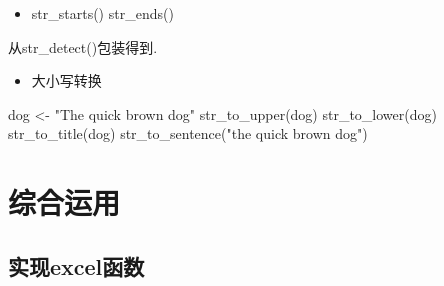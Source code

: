 \documentclass[
]{book}
\newenvironment{Shaded}{\begin{snugshade}}{\end{snugshade}}
\newcommand{\FunctionTok}[1]{\textcolor[rgb]{0.00,0.00,0.00}{#1}}
\newcommand{\NormalTok}[1]{#1}
\newcommand{\OtherTok}[1]{\textcolor[rgb]{0.56,0.35,0.01}{#1}}
\newcommand{\StringTok}[1]{\textcolor[rgb]{0.31,0.60,0.02}{#1}}
\providecommand{\tightlist}{%
  \setlength{\itemsep}{0pt}\setlength{\parskip}{0pt}}
\begin{document}
\begin{itemize}
\tightlist
\item
  str\_starts() str\_ends()
\end{itemize}

从str\_detect()包装得到.

\begin{Shaded}
\end{Shaded}

\begin{itemize}
\tightlist
\item
  大小写转换
\end{itemize}

\begin{Shaded}
\begin{Highlighting}[]
\NormalTok{dog }\OtherTok{\textless{}{-}} \StringTok{"The quick brown dog"}
\FunctionTok{str\_to\_upper}\NormalTok{(dog)}
\FunctionTok{str\_to\_lower}\NormalTok{(dog)}
\FunctionTok{str\_to\_title}\NormalTok{(dog)}
\FunctionTok{str\_to\_sentence}\NormalTok{(}\StringTok{"the quick brown dog"}\NormalTok{)}
\end{Highlighting}
\end{Shaded}

\hypertarget{ux7efcux5408ux8fd0ux7528}{%
\section{综合运用}\label{ux7efcux5408ux8fd0ux7528}}

\hypertarget{ux5b9eux73b0excelux51fdux6570}{%
\subsection{实现excel函数}\label{ux5b9eux73b0excelux51fdux6570}}
\end{document}
